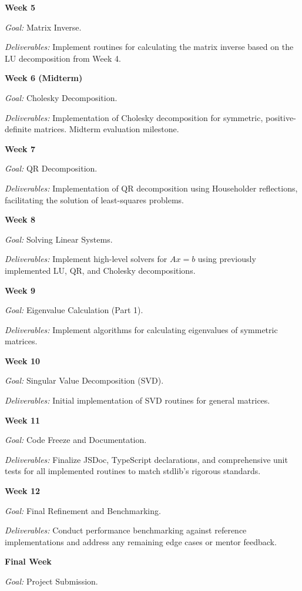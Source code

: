 \documentclass[
	a4paper,
	12pt
]{article}
\begin{document}
\textbf{Week 5}

\textit{Goal:} Matrix Inverse.

\textit{Deliverables:} Implement routines for calculating the matrix inverse based on the LU decomposition from Week 4.

\textbf{Week 6 (Midterm)}

\textit{Goal:} Cholesky Decomposition.

\textit{Deliverables:} Implementation of Cholesky decomposition for symmetric, positive-definite matrices. Midterm evaluation milestone.

\textbf{Week 7}

\textit{Goal:} QR Decomposition.

\textit{Deliverables:} Implementation of QR decomposition using Householder reflections, facilitating the solution of least-squares problems.

\pagebreak
\textbf{Week 8}

\textit{Goal:} Solving Linear Systems.

\textit{Deliverables:} Implement high-level solvers for \(Ax = b\) using previously implemented LU, QR, and Cholesky decompositions.

\textbf{Week 9}

\textit{Goal:} Eigenvalue Calculation (Part 1).

\textit{Deliverables:} Implement algorithms for calculating eigenvalues of symmetric matrices.

\textbf{Week 10}

\textit{Goal:} Singular Value Decomposition (SVD).

\textit{Deliverables:} Initial implementation of SVD routines for general matrices.

\textbf{Week 11}

\textit{Goal:} Code Freeze and Documentation.

\textit{Deliverables:} Finalize JSDoc, TypeScript declarations, and comprehensive unit tests for all implemented routines to match stdlib's rigorous standards.

\textbf{Week 12}

\textit{Goal:} Final Refinement and Benchmarking.

\textit{Deliverables:} Conduct performance benchmarking against reference implementations and address any remaining edge cases or mentor feedback.

\textbf{Final Week}

\textit{Goal:} Project Submission.
\end{document}
